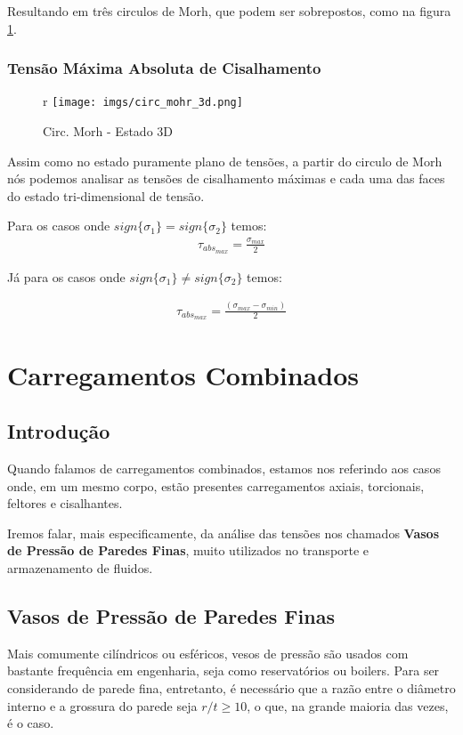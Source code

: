 \documentclass{article}
\begin{document}
Resultando em três circulos de Morh, que podem ser sobrepostos, como na figura \ref{fig:morh_circ_3d}.

\newpage
\subsubsection{Tensão Máxima Absoluta de Cisalhamento}

\begin{figure}[11]{r}
    \centering
    \texttt{[image: imgs/circ\_mohr\_3d.png]}
    \caption{Circ. Morh - Estado 3D}
    \label{fig:morh_circ_3d}
\end{figure}

Assim como no estado puramente plano de tensões, a partir do circulo de Morh nós podemos analisar as tensões de cisalhamento máximas e cada uma das faces do estado tri-dimensional de tensão.

Para os casos onde $sign\{\sigma_1\} = sign\{\sigma_2\}$ temos:
\begin{align}
    \tau_{abs_{max}} = \frac{\sigma_{max}}{2}
\end{align}

Já para os casos onde $sign\{\sigma_1\} \ne sign\{\sigma_2\}$ temos:

\begin{align}
    \tau_{abs_{max}} = \frac{(\sigma_{max} - \sigma_{min})}{2}
\end{align}

\newpage
\section{Carregamentos Combinados}
\subsection{Introdução}
Quando falamos de carregamentos combinados, estamos nos referindo aos casos onde, em um mesmo corpo, estão presentes carregamentos axiais, torcionais, feltores e cisalhantes. 

Iremos falar, mais especificamente, da análise das tensões nos chamados \textbf{Vasos de Pressão de Paredes Finas}, muito utilizados no transporte e armazenamento de fluidos.

\subsection{Vasos de Pressão de Paredes Finas}
Mais comumente cilíndricos ou esféricos, vesos de pressão são usados com bastante frequência em engenharia, seja como reservatórios ou boilers. Para ser considerando de parede fina, entretanto, é necessário que a razão entre o diâmetro interno e a grossura do parede seja $r/t \ge 10$, o que, na grande maioria das vezes, é o caso.
\end{document}
